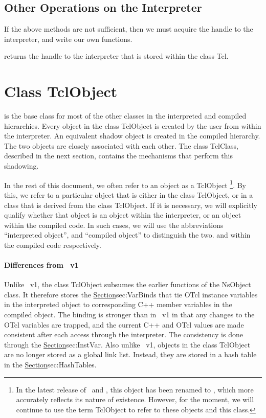 \subsection{Other Operations on the Interpreter}
\label{sec:otcl:other}

If the above methods are not sufficient,
then we must acquire the handle to the interpreter,
and write our own functions.
\begin{list}{\textbullet}{}
\item {}
        returns the handle to the interpreter that is stored
        within the class Tcl.
\end{list}

\section{Class TclObject}
\label{sec:TclObject}

is the base class for most of the other classes
in the interpreted and compiled hierarchies.
Every object in the class TclObject is created by the user
from within the interpreter.
An equivalent shadow object is created in the compiled hierarchy.
The two objects are closely associated with each other.
The class TclClass, described in the next section,
contains the mechanisms that perform this shadowing.

In the rest of this document, we often refer to an object as a TclObject%
\footnote{In the latest release of \ns\ and \nsTcl,
  this object has been renamed to ,
  which more accurately reflects its nature of existence.
  However, for the moment,
  we will continue to use the term TclObject
  to refer to these objects and this class.}.
By this, we refer to a particular object that is either in the class
TclObject, or in a class that is derived from the class TclObject.
If it is necessary, we will explicitly qualify whether that object is
an object within the interpreter, or an object within the compiled code.
In such cases,
we will use the abbreviations ``interpreted object'', and
``compiled object'' to distinguish the two.
and within the compiled code respectively.

\paragraph{Differences from \ns~v1}
Unlike \ns~v1, the class TclObject
subsumes the earlier functions of the NsObject class.
It therefore stores the
\href{interface variable bindings}{Section}{sec:VarBinds}
that tie OTcl instance variables in the interpreted object
to corresponding C++ member variables in the compiled object.
The binding is stronger than in \ns~v1 in that
any changes to the OTcl variables are trapped,
and the current C++ and OTcl values
are made consistent after each access through the interpreter.
The consistency is done through the
\href{class InstVar}{Section}{sec:InstVar}.
Also unlike \ns~v1, objects in the class TclObject
are no longer stored as a global link list.
Instead, they are stored in a hash table in the
\href{class Tcl}{Section}{sec:HashTables}.

